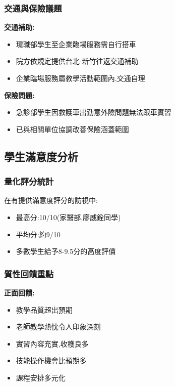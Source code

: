 \documentclass[12pt,a4paper]{article}
\begin{document}
\subsubsection{交通與保險議題}

\textbf{交通補助:}
\begin{itemize}[leftmargin=*]
\item 環職部學生至企業臨場服務需自行搭車
\item 院方依規定提供台北-新竹往返交通補助
\item 企業臨場服務屬教學活動範圍內,交通自理
\end{itemize}

\textbf{保險問題:}
\begin{itemize}[leftmargin=*]
\item 急診部學生因救護車出勤意外險問題無法跟車實習
\item 已與相關單位協調改善保險涵蓋範圍
\end{itemize}

\subsection{學生滿意度分析}

\subsubsection{量化評分統計}

在有提供滿意度評分的訪視中:
\begin{itemize}[leftmargin=*]
\item 最高分:10/10(家醫部,廖威銓同學)
\item 平均分:約9/10
\item 多數學生給予8-9.5分的高度評價
\end{itemize}

\subsubsection{質性回饋重點}

\textbf{正面回饋:}
\begin{itemize}[leftmargin=*]
\item 教學品質超出預期
\item 老師教學熱忱令人印象深刻
\item 實習內容充實,收穫良多
\item 技能操作機會比預期多
\item 課程安排多元化
\end{itemize}
\end{document}
